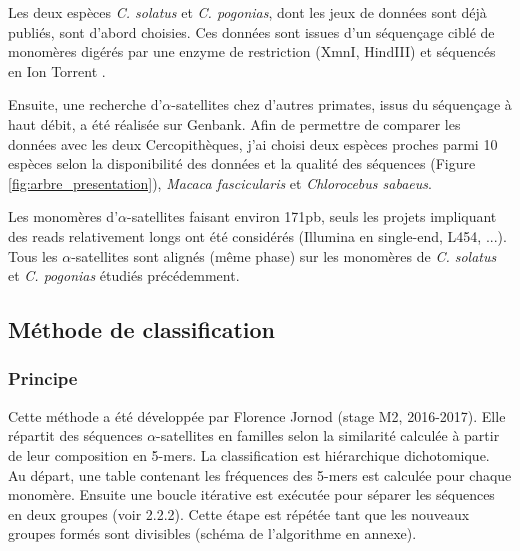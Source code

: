 \documentclass[12pt,a4paper]{article}
\begin{document}

Les deux espèces \textit{C. solatus} et \textit{C. pogonias}, dont les jeux de données sont déjà publiés, sont d'abord choisies. Ces données sont issues d'un séquençage ciblé de monomères digérés par une enzyme de restriction (XmnI, HindIII) et séquencés en Ion Torrent \cite{Benjak2015}. 

Ensuite, une recherche d'$\alpha$-satellites chez d'autres primates, issus du séquençage à haut débit, a été réalisée sur Genbank. Afin de permettre de comparer les données avec les deux Cercopithèques, j'ai choisi deux espèces proches parmi 10 espèces selon la disponibilité des données et la qualité des séquences (Figure \ref{fig:arbre_presentation}), \textit{Macaca fascicularis} et \textit{Chlorocebus sabaeus}.

Les monomères d'$\alpha$-satellites faisant environ 171pb,  seuls les projets impliquant des reads relativement longs ont été considérés (Illumina en single-end, L454, ...). Tous les $\alpha$-satellites sont alignés (même phase) sur les monomères de \textit{C. solatus} et \textit{C. pogonias} étudiés précédemment.


\subsection{Méthode de classification}
	\subsubsection{Principe}
Cette méthode a été développée par Florence Jornod (stage M2, 2016-2017). Elle répartit des séquences $\alpha$-satellites en familles selon la similarité calculée à partir de leur composition en 5-mers. La classification est hiérarchique dichotomique. Au départ, une table contenant les fréquences des 5-mers est calculée pour chaque monomère. Ensuite une boucle itérative est exécutée pour séparer les séquences en deux groupes (voir 2.2.2). Cette étape est répétée tant que les nouveaux groupes formés sont divisibles (schéma de l'algorithme en annexe).
\end{document}
